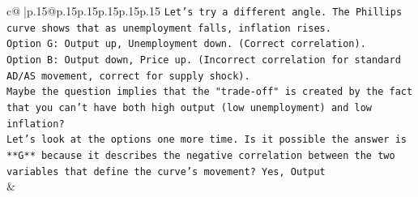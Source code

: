 \documentclass{article}
\begin{document}
{\begin{supertabular}{c@{$\;$}|p{.15\linewidth}@{}p{.15\linewidth}p{.15\linewidth}p{.15\linewidth}p{.15\linewidth}p{.15\linewidth}}
{{{\texttt{Let's try a different angle. The Phillips curve shows that as unemployment falls, inflation rises.} \\
\texttt{Option G: Output up, Unemployment down. (Correct correlation).} \\
\texttt{Option B: Output down, Price up. (Incorrect correlation for standard AD/AS movement, correct for supply shock).} \\
\texttt{Maybe the question implies that the "trade{-}off" is created by the fact that you can't have both high output (low unemployment) and low inflation?} \\
\texttt{Let's look at the options one more time. Is it possible the answer is **G** because it describes the negative correlation between the two variables that define the curve's movement? Yes, Output} \\
            }
        }
    }
    & \\ \\

\end{supertabular}
}
\end{document}
